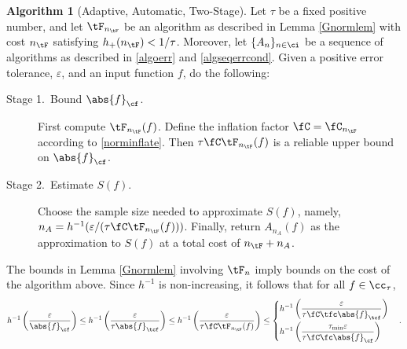 \documentclass[]{elsarticle}
\theoremstyle{definition}
\newtheorem{algo}{Algorithm}
\theoremstyle{remark}
\newcommand{\Fnorm}[1]{\abs{#1}_{\cf}}
\newcommand{\Ftnorm}[1]{\abs{#1}_{\tcf}}
\begin{document}
\begin{algo}[Adaptive, Automatic, Two-Stage] \label{twostagedetalgo} Let $\tau$ be a fixed positive number, and let $\tF_{n_{\tF}}$ be an algorithm as described in Lemma \ref{Gnormlem} with cost $n_{\tF}$ satisfying $h_{+}(n_{\tF}) < 1/\tau$.
Moreover, let  $\{A_n\}_{n \in \ci}$ be a sequence of algorithms as described in \eqref{algoerr} and \eqref{algseqerrcond}.  Given  a positive error tolerance, $\varepsilon$, and  an input function $f$, do the following:

\begin{description} 

\item[Stage 1.\ Bound {$\Fnorm{f}$}.] First compute $\tF_{n_{\tF}}(f)$.  Define the inflation factor $\fC=\fC_{n_{\tF}}$ according to \eqref{norminflate}.
Then $\tau \fC \tF_{n_{\tF}}(f)$ is a reliable upper bound on $\Fnorm{f}$.  

\item [Stage 2.\ Estimate {$S(f)$}.] Choose the sample size needed to approximate $S(f)$, namely, $n_A=h^{-1}(\varepsilon/(\tau\fC \tF_{n_{\tF}}(f)))$.  Finally, return $A_{n_A}(f)$ as the approximation to $S(f)$ at a total cost of $n_{\tF}+n_A$. 
\end{description}
\end{algo}

The bounds in Lemma \ref{Gnormlem} involving $\tF_n$ imply bounds on the cost of the algorithm above.  Since $h^{-1}$ is non-increasing, it follows that for all $f \in \cc_{\tau}$,
\begin{equation*}
h^{-1}\left(\frac{\varepsilon}{\Fnorm{f}}\right) \le  h^{-1}\left(\frac{\varepsilon}{\tau\Ftnorm{f}}\right)  \le h^{-1}\left(\frac{\varepsilon}{\tau \fC \tF_{n_{\tF}}(f)}\right) \le 
\begin{cases} \displaystyle  h^{-1}\left(\frac{\varepsilon}{\tau \fC \tfc \Ftnorm{f}}\right) \\[2ex]
\displaystyle  h^{-1}\left(\frac{\tau_{\min} \varepsilon}{\tau \fC \fc \Fnorm{f}}\right)\end{cases}.
\end{equation*}
\end{document}
